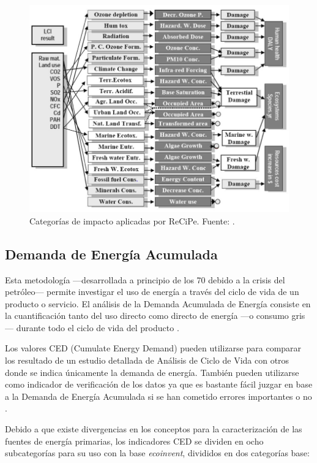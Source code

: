 \begin{figure}[!htb]
\centering
\includegraphics[width=12cm]{img/recipecategoriasimpacto.png}
\caption[Categorías de impacto aplicadas por ReCiPe.]{Categorías de impacto aplicadas por ReCiPe. Fuente: \protect\cite{mgoedkoop3}.}
\label{fig:recipecategoriasimpacto}
\end{figure}

\subsection{Demanda de Energía Acumulada}

Esta metodología —desarrollada a principio de los 70 debido a la crisis del petróleo— permite investigar el uso de energía a través del ciclo de vida de un producto o servicio. El análisis de la Demanda Acumulada de Energía consiste en la cuantificación tanto del uso directo como directo de energía —o consumo gris— durante todo el ciclo de vida del producto \cite{ecoinventlcia}.

Los valores CED (Cumulate Energy Demand) pueden utilizarse para comparar los resultado de un estudio detallada de Análisis de Ciclo de Vida con otros donde se indica únicamente la demanda de energía. También pueden utilizarse como indicador de verificación de los datos ya que es bastante fácil juzgar en base a la Demanda de Energía Acumulada si se han cometido errores importantes o no \cite{ecoinventlcia}.

Debido a que existe divergencias en los conceptos para la caracterización de las fuentes de energía primarias, los indicadores CED se dividen en ocho subcategorías para su uso con la base \textit{ecoinvent}, divididos en dos categorías base:

